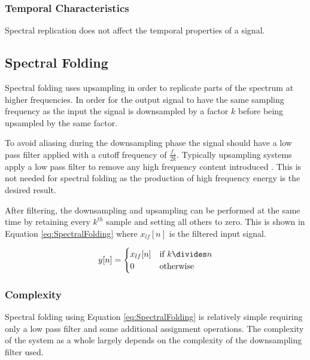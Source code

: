 		\subsubsection*{Temporal Characteristics}
			Spectral replication does not affect the temporal properties of a signal.


	\subsection{Spectral Folding}
	\label{sec:Excitation-SpectralFolding}
		Spectral folding uses upsampling in order to replicate parts of the spectrum at higher frequencies. In
		order for the output signal to have the same sampling frequency as the input the signal is 
		downsampled by a factor $k$ before being upsampled by the same factor. 
		
		To avoid aliasing during the downsampling phase the signal should have a low pass filter applied
		with a cutoff frequency of $\frac{f_{s}}{2k}$. Typically upsampling systems apply a low pass filter
		to remove any high frequency content introduced \citep{oppenheim2014discrete}. This is not needed for
		spectral folding as the production of high frequency energy is the desired result.

		After filtering, the downsampling and upsampling can be performed at the same time by retaining
		every $k^{th}$ sample and setting all others to zero. This is shown in Equation
		\ref{eq:SpectralFolding} where $x_{lf}[n]$ is the filtered input signal.		

		\begin{equation}
			y[n] = \begin{cases}
				x_{lf}[n] & \text{if $k \divides n$} \\
				0 & \text{otherwise}
			\end{cases}
			\label{eq:SpectralFolding}
		\end{equation}

		\subsubsection*{Complexity}
			Spectral folding using Equation \ref{eq:SpectralFolding} is relatively simple requiring only a low
			pass filter and some additional assignment operations. The complexity of the system as a whole
			largely depends on the complexity of the downsampling filter used.

